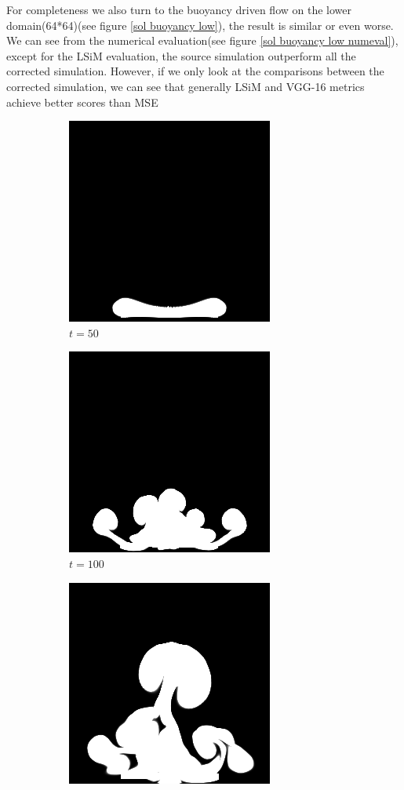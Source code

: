 \documentclass[a4paper,12pt,twoside]{report}
\begin{document}
For completeness we also turn to the buoyancy driven flow on the lower domain(64*64)(see figure \ref{sol buoyancy low}), the result is similar or even worse. We can see from the numerical evaluation(see figure \ref{sol buoyancy low numeval}), except for the LSiM evaluation, the source simulation outperform all the corrected simulation. However, if we only look at the comparisons between the corrected simulation, we can see that generally LSiM and VGG-16 metrics achieve better scores than MSE
\begin{figure}
\centering
\begin{subfigure}{0.18\textwidth}
  \centering
  \includegraphics[scale=0.28]{buoyancy_test/dens_000050_ref.png}
  \caption{$t=50$}
\end{subfigure}
\begin{subfigure}{0.18\textwidth}
  \centering
  \includegraphics[scale=0.28]{buoyancy_test/dens_000100_ref.png}
  \caption{$t=100$}
\end{subfigure}
\begin{subfigure}{0.18\textwidth}
  \centering
  \includegraphics[scale=0.28]{buoyancy_test/dens_000150_ref.png}

\end{subfigure}
\end{figure}
\end{document}
